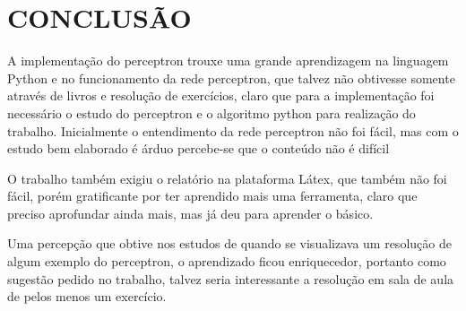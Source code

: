 \documentclass[
12pt, 
a4paper,
oneside,			%
english,			%
french,				%
spanish,			%
brazil,	
]{abntex2}
\begin{document}
\chapter*[CONCLUSÃO]{CONCLUSÃO}

A implementação do perceptron trouxe uma grande aprendizagem na linguagem Python e no funcionamento da rede perceptron, que talvez não obtivesse somente através de livros e resolução de exercícios, claro que para a implementação foi necessário o estudo do perceptron e o algoritmo python para realização do trabalho. Inicialmente o entendimento da rede perceptron não foi fácil, mas com o estudo bem elaborado é árduo percebe-se que o conteúdo não é difícil

O trabalho também exigiu o relatório na plataforma Látex, que também não foi fácil, porém gratificante por ter aprendido mais uma ferramenta, claro que preciso aprofundar ainda mais, mas já deu para aprender o básico. \cite{latex}\cite{latex2}

Uma percepção que obtive nos estudos de quando se visualizava um resolução de algum exemplo do perceptron, o aprendizado ficou enriquecedor, portanto como sugestão pedido no trabalho, talvez seria interessante a resolução em sala de aula de pelos menos um exercício.  



\end{document}
